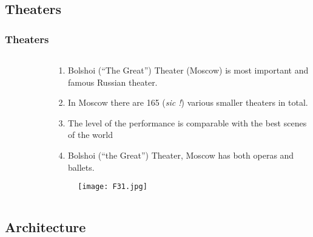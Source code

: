 \documentclass[pdflatex,compress,8pt,
	xcolor={dvipsnames,dvipsnames,svgnames,x11names,table},
	hyperref={colorlinks = true,breaklinks = true, urlcolor = NavyBlue, breaklinks = true}]{beamer}
\begin{document}
\subsection{Theaters}
\begin{frame}\frametitle{Theaters}
\begin{minipage}[0.4\textheight]{\textwidth}
\begin{columns}[T]
\begin{column}{0.5\textwidth}
\begin{figure}[H]
	\centering
			\hspace{5mm}
\end{figure}
\end{column}
\begin{column}{0.5\textwidth}
\begin{enumerate}
	\item Bolshoi (“The Great”) Theater (Moscow) is most important and famous Russian theater.
	\item In Moscow there are 165 (\emph{sic !}) various smaller theaters in total. 
	\item The level of the performance is comparable with the best scenes of the world  
	\item Bolshoi (“the Great”) Theater, Moscow has both operas and ballets.
\end{enumerate}
\begin{figure}[H]
	\centering
		\texttt{[image: F31.jpg]}
\end{figure}
\end{column}
\end{columns}
\end{minipage}
\end{frame}

\subsection{Architecture}
\end{document}
